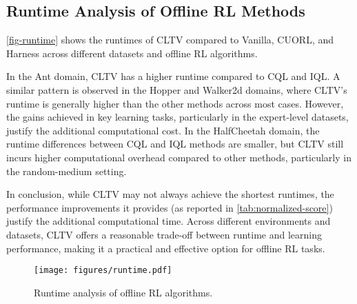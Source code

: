\subsection{Runtime Analysis of Offline RL Methods}
\label{runtime-analysis}
\autoref{fig-runtime} shows the runtimes of CLTV compared to Vanilla, CUORL, and Harness across different datasets and offline RL algorithms.

In the Ant domain, CLTV has a higher runtime compared to CQL and IQL. A similar pattern is observed in the Hopper and Walker2d domains, where CLTV’s runtime is generally higher than the other methods across most cases. However, the gains achieved in key learning tasks, particularly in the expert-level datasets, justify the additional computational cost. In the HalfCheetah domain, the runtime differences between CQL and IQL methods are smaller, but CLTV still incurs higher computational overhead compared to other methods, particularly in the random-medium setting. 

In conclusion, while CLTV may not always achieve the shortest runtimes, the performance improvements it provides (as reported in \autoref{tab:normalized-score}) justify the additional computational time. Across different environments and datasets, CLTV offers a reasonable trade-off between runtime and learning performance, making it a practical and effective option for offline RL tasks.

\begin{figure}[!ht]
\center
\texttt{[image: figures/runtime.pdf]}
\caption{Runtime analysis of offline RL algorithms.}
\label{fig-runtime}
\end{figure}